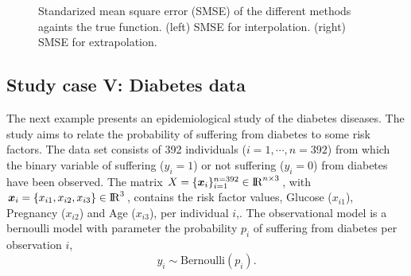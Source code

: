 \documentclass[]{interact}
\theoremstyle{plain}%
\theoremstyle{definition}
\theoremstyle{remark}
\begin{document}
\begin{figure}
\caption{Standarized mean square error (SMSE) of the different methods againts the true function. (left) SMSE for interpolation. (right) SMSE for extrapolation.}
  \label{fig17_RMSE_exII}
\end{figure}


\subsection{Study case V: Diabetes data}\label{sec:bf_caseV}
The next example presents an epidemiological study of the diabetes diseases. The study aims to relate the probability of suffering from diabetes to some risk factors. The data set consists of 392 individuals ($i=1,\cdots,n=392$) from which the binary variable of suffering ($y_i=1$) or not suffering ($y_i=0$) from diabetes have been observed. The matrix $X=\{\bm{x}_i\}_{i=1}^{n=392} \in {\rm I\!R}^{n\times 3}$,  with $\bm{x}_i=\{x_{i1},x_{i2},x_{i3}\} \in {\rm I\!R}^{3}$, contains the risk factor values, Glucose ($x_{i1}$), Pregnancy ($x_{i2}$) and Age ($x_{i3}$), per individual $i$,. The observational model is a bernoulli model with parameter the probability $p_i$ of suffering from diabetes per observation $i$,
%
\begin{equation*}
y_i \sim \text{Bernoulli}(p_i).
\end{equation*}
\end{document}
